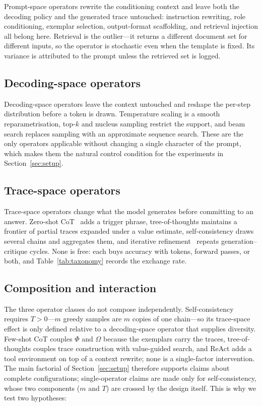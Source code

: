 \documentclass[conference]{IEEEtran}
\begin{document}
Prompt-space operators rewrite the conditioning context and leave
both the decoding policy and the generated trace untouched:
instruction rewriting, role conditioning, exemplar selection,
output-format scaffolding, and retrieval injection all belong here.
Retrieval is the outlier---it returns a different document set for
different inputs, so the operator is stochastic even when the template
is fixed.  Its variance is attributed to the prompt unless the
retrieved set is logged.

\subsection{Decoding-space operators}

Decoding-space operators leave the context untouched and reshape the
per-step distribution before a token is drawn.  Temperature scaling is
a smooth reparametrisation, top-$k$ and nucleus sampling restrict the
support, and beam search replaces sampling with an approximate
sequence search.  These are the only operators applicable without
changing a single character of the prompt, which makes them the
natural control condition for the experiments in
Section~\ref{sec:setup}.

\subsection{Trace-space operators}

Trace-space operators change what the model generates before
committing to an answer.  Zero-shot CoT~\cite{b9} adds a trigger
phrase, tree-of-thoughts maintains a frontier of partial traces
expanded under a value estimate, self-consistency draws several
chains and aggregates them, and iterative refinement~\cite{b12}
repeats generation--critique cycles.  None is free: each buys
accuracy with tokens, forward passes, or both, and
Table~\ref{tab:taxonomy} records the exchange rate.

\subsection{Composition and interaction}

The three operator classes do not compose independently.  Self-consistency
requires $T > 0$---$m$ greedy samples are $m$ copies of one chain---so
its trace-space effect is only defined relative to a decoding-space
operator that supplies diversity.  Few-shot CoT couples $\Phi$ and
$\Omega$ because the exemplars carry the traces, tree-of-thoughts
couples trace construction with value-guided search, and ReAct adds a
tool environment on top of a context rewrite; none is a single-factor
intervention.  The main factorial of Section~\ref{sec:setup} therefore
supports claims about complete configurations; single-operator claims
are made only for self-consistency, whose two components ($m$ and
$T$) are crossed by the design itself.  This is why we test two
hypotheses:
\end{document}
